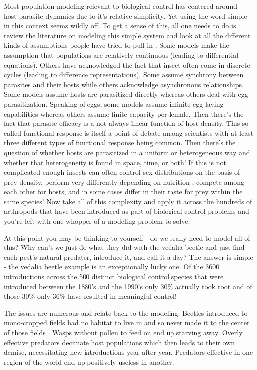 \documentclass[11pt,a5paper]{book}
\begin{document}
Most population modeling relevant to biological control has centered around host-parasite dynamics \cite{ahajek} due to it's relative simplicity. Yet using the word simple in this context seems wildly off. To get a sense of this, all one needs to do is review the literature on modeling this simple system and look at all the different kinds of assumptions people have tried to pull in \cite{nmills}. Some models make the assumption that populations are relatively continuous (leading to differential equations). Others have acknowledged the fact that insect often come in discrete cycles (leading to difference representations). Some assume synchrony between parasites and their hosts while others acknowledge asynchronous relationships. Some models assume hosts are parasitized directly whereas others deal with egg parasitization. Speaking of eggs, some models assume infinite egg laying capabilities whereas others assume finite capacity per female. Then there's the fact that parasite efficacy is a not-always-linear function of host density. This so called functional response is itself a point of debate among scientists with at least three different types of functional response being common. Then there's the question of whether hosts are parasitized in a uniform or heterogeneous way and whether that heterogeneity is found in space, time, or both! If this is not complicated enough insects can often control sex distributions on the basis of prey density, perform very differently depending on nutrition \cite{ridgway}, compete among each other for hosts, and in some cases differ in their taste for prey within the same species! Now take all of this complexity and apply it across the hundreds of arthropods \cite{nmills} that have been introduced as part of biological control problems and you're left with one whopper of a modeling problem to solve. 
\newline

At this point you may be thinking to yourself - do we really need to model all of this? Why can't we just do what they did with the vedalia beetle and just find each pest's natural predator, introduce it, and call it a day? The answer is simple - the vedalia beetle example is an exceptionally lucky one. Of the 3600 introductions across the 500 distinct biological control species that were introduced between the 1880's and the 1990's only 30\% actually took root and of those 30\% only 36\% have resulted in meaningful control!
\newline

The issues are numerous and relate back to the modeling. Beetles introduced to mono-cropped fields had no habitat to live in and so never made it to the center of those fields \cite{ahajek}. Wasps without pollen to feed on end up starving away. Overly effective predators decimate host populations which then leads to their own demise, necessitating new introductions year after year. Predators effective in one region of the world end up positively useless in another. 
\newline
\end{document}

